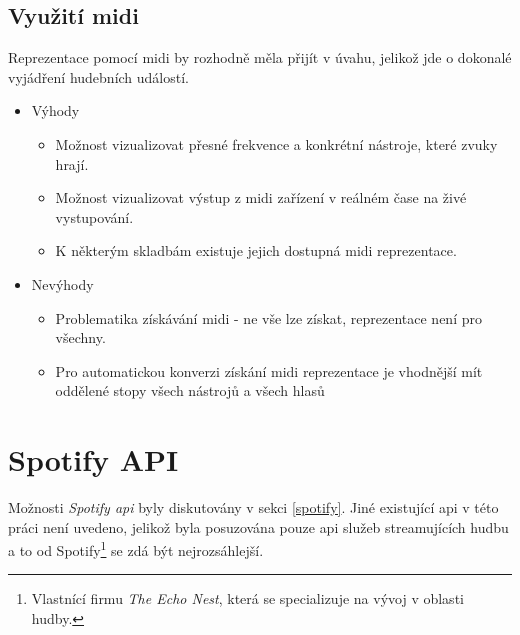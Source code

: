 \documentclass[thesis=B, czech]{FITthesis}[2019/03/06]
\begin{document}
\subsection*{Využití \gls{midi}}

Reprezentace pomocí \gls{midi} by rozhodně měla přijít v úvahu, jelikož jde o dokonalé vyjádření hudebních událostí.

\begin{itemize}
    \item Výhody
        \begin{itemize}
            \item Možnost vizualizovat přesné frekvence a konkrétní nástroje, které zvuky hrají.
            \item Možnost vizualizovat výstup z \gls{midi} zařízení v reálném čase na živé vystupování.
            \item K některým skladbám existuje jejich dostupná \gls{midi} reprezentace.
        \end{itemize}
    \item Nevýhody
        \begin{itemize}
            \item Problematika získávání \gls{midi} - ne vše lze získat, reprezentace není pro všechny.
            \item Pro automatickou konverzi získání \gls{midi} reprezentace je vhodnější mít oddělené stopy všech nástrojů a všech hlasů
        \end{itemize}
\end{itemize}


\section{Spotify API}

Možnosti \textit{Spotify \gls{api}} byly diskutovány v sekci \ref{spotify}. Jiné existující \gls{api} v této práci není uvedeno, jelikož byla posuzována pouze \gls{api} služeb streamujících hudbu a to od Spotify\footnote{Vlastnící firmu \textit{The Echo Nest}, která se specializuje na vývoj v oblasti hudby.} se zdá být nejrozsáhlejší.
\end{document}
